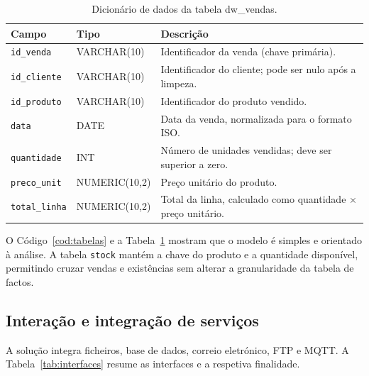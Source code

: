 \documentclass[11pt,a4paper]{article}
\begin{document}
\begin{table}[H]
\centering
\small
\begin{tabular}{|l|l|p{7cm}|}
\hline
Campo & Tipo & Descrição \\ \hline
\texttt{id\_venda} & VARCHAR(10) & Identificador da venda (chave primária). \\ \hline
\texttt{id\_cliente} & VARCHAR(10) & Identificador do cliente; pode ser nulo após a limpeza. \\ \hline
\texttt{id\_produto} & VARCHAR(10) & Identificador do produto vendido. \\ \hline
\texttt{data} & DATE & Data da venda, normalizada para o formato ISO. \\ \hline
\texttt{quantidade} & INT & Número de unidades vendidas; deve ser superior a zero. \\ \hline
\texttt{preco\_unit} & NUMERIC(10,2) & Preço unitário do produto. \\ \hline
\texttt{total\_linha} & NUMERIC(10,2) & Total da linha, calculado como quantidade $\times$ preço unitário. \\ \hline
\end{tabular}
\caption{Dicionário de dados da tabela dw\_vendas.}
\label{tab:dicionario}
\end{table}

O Código~\ref{cod:tabelas} e a Tabela~\ref{tab:dicionario} mostram que o modelo é simples e orientado à análise. A tabela \texttt{stock} mantém a chave do produto e a quantidade disponível, permitindo cruzar vendas e existências sem alterar a granularidade da tabela de factos.

\subsection{Interação e integração de serviços}
A solução integra ficheiros, base de dados, correio eletrónico, FTP e MQTT. A Tabela~\ref{tab:interfaces} resume as interfaces e a respetiva finalidade.
\end{document}
